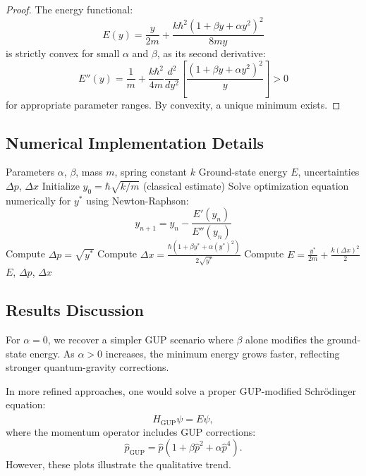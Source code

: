 \begin{proof}
The energy functional:
\[
E(y) = \frac{y}{2m} + \frac{k\hbar^2(1 + \beta y + \alpha y^2)^2}{8my}
\]
is strictly convex for small $\alpha$ and $\beta$, as its second derivative:
\[
E''(y) = \frac{1}{m} + \frac{k\hbar^2}{4m}\frac{d^2}{dy^2}\left[\frac{(1 + \beta y + \alpha y^2)^2}{y}\right] > 0
\]
for appropriate parameter ranges. By convexity, a unique minimum exists.
\end{proof}

\subsection{Numerical Implementation Details}

\begin{algorithm}[H]
\caption{GUP Ground-State Energy Calculation}
\begin{algorithmic}[1]
\REQUIRE Parameters $\alpha$, $\beta$, mass $m$, spring constant $k$
\ENSURE Ground-state energy $E$, uncertainties $\Delta p$, $\Delta x$
\STATE Initialize $y_0 = \hbar\sqrt{k/m}$ (classical estimate)
\STATE Solve optimization equation numerically for $y^*$ using Newton-Raphson:
\[
y_{n+1} = y_n - \frac{E'(y_n)}{E''(y_n)}
\]
\STATE Compute $\Delta p = \sqrt{y^*}$
\STATE Compute $\Delta x = \frac{\hbar(1 + \beta y^* + \alpha (y^*)^2)}{2\sqrt{y^*}}$
\STATE Compute $E = \frac{y^*}{2m} + \frac{k(\Delta x)^2}{2}$
\RETURN $E$, $\Delta p$, $\Delta x$
\end{algorithmic}
\end{algorithm}

\subsection{Results Discussion}

\begin{proposition}
For $\alpha = 0$, we recover a simpler GUP scenario where $\beta$ alone modifies the ground-state energy. As $\alpha > 0$ increases, the minimum energy grows faster, reflecting stronger quantum-gravity corrections.
\end{proposition}

\begin{remark}
In more refined approaches, one would solve a proper GUP-modified Schrödinger equation:
\[
\hat{H}_{\text{GUP}} \psi = E \psi,
\]
where the momentum operator includes GUP corrections:
\[
\hat{p}_{\text{GUP}} = \hat{p}(1 + \beta \hat{p}^2 + \alpha \hat{p}^4).
\]
However, these plots illustrate the qualitative trend.
\end{remark}

